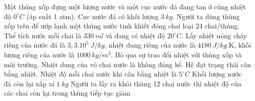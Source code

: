			\begin{ex} 
			Một thùng xốp đựng một lượng nước và một cục nước đá đang tan ở cùng nhiệt độ $0^\circ C$ (áp suất 1 atm). Cục nước đá có khối lượng $3 \ kg$. Người ta dùng thùng xốp trên để ướp lạnh một thùng nước tinh khiết đóng chai loại 24 chai/thùng. Thể tích nước mỗi chai là $330\ ml$ và đang có nhiệt độ $20^\circ C$. Lấy nhiệt nóng chảy riêng của nước đá là $3,3.10^{5} \ J/kg$, nhiệt dung riêng của nước là $4180 \ J/kg$.K, khối lượng riêng của nước là $1000 \ kg / m^3$. Bỏ qua sự trao đổi nhiệt với thùng xốp và môi trường. Nhiệt dung của vỏ chai nước là không đáng kể. Hệ đạt trạng thái cân bằng nhiệt.
			{Nhiệt độ mỗi chai nước khi cân bằng nhiệt là $5^\circ C$}
			{\True Khối lượng nước đá còn lại xấp xỉ $1 \ kg$}
			{Người ta lấy ra khỏi thùng 12 chai nước thì nhiệt độ của các chai còn lại trong thùng tiếp tục giảm}
		\end{ex}
	